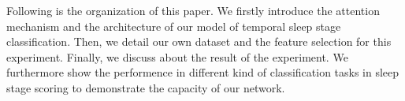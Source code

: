 \documentclass[journal]{IEEEtran}
\begin{document}
Following is the organization of this paper. We firstly introduce the attention mechanism and the architecture of our model of temporal sleep stage classification. Then, we detail our own dataset and the feature selection for this experiment. Finally, we discuss about the result of the experiment. We furthermore show the performence in different kind of classification tasks in sleep stage scoring to demonstrate the capacity of our network.


%
%



%
%
\end{document}
